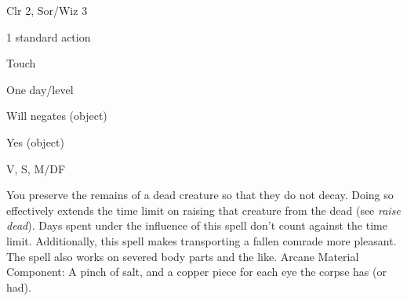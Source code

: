 
\begin{description*}
\item[Level:] Clr 2, Sor/Wiz 3
\item[Casting Time:] 1 standard action
\item[Range:] Touch
\item[Duration:] One day/level
\item[Saving Throw:] Will negates (object)
\item[Spell Resistance:] Yes (object)
\item[Components:] V, S, M/DF
\end{description*}

You preserve the remains of a dead creature so that they do not decay. Doing so
effectively extends the time limit on raising that creature from the dead (see
\textit{raise dead}). Days spent under the influence of this spell don't count
against the time limit. Additionally, this spell makes transporting a fallen comrade
more pleasant.
The spell also works on severed body parts and the like.
Arcane Material Component: A pinch of salt, and a copper piece for each
eye the corpse has (or had).
